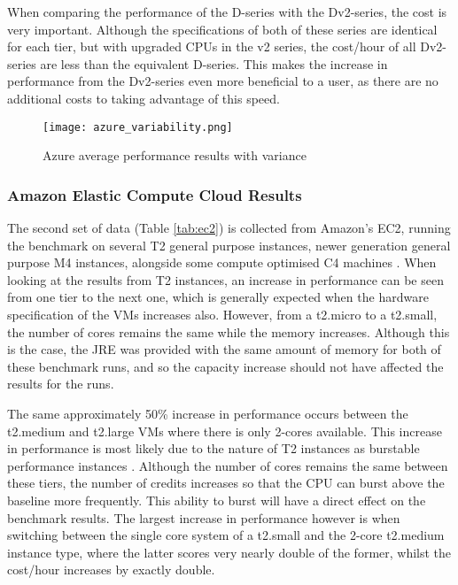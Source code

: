 \documentclass{llncs}
\begin{document}
When comparing the performance of the D-series with the Dv2-series, the cost is very important. Although the specifications of both of these series are identical for each tier, but with upgraded CPUs in the v2 series, the cost/hour of all Dv2-series are less than the equivalent D-series. This makes the increase in performance from the Dv2-series even more beneficial to a user, as there are no additional costs to taking advantage of this speed.



\begin{figure}[ht]
  \centering
  \texttt{[image: azure\_variability.png]}
  \caption{Azure average performance results with variance}
  \label{fig:azurevariability}
\end{figure}

\subsubsection{Amazon Elastic Compute Cloud Results}\label{sec:eval:awsresults}

The second set of data (Table \ref{tab:ec2}) is collected from Amazon's EC2, running the benchmark on several T2 general purpose instances, newer generation general purpose M4 instances, alongside some compute optimised C4 machines \cite{awsvmtype}. When looking at the results from T2 instances, an increase in performance can be seen from one tier to the next one, which is generally expected when the hardware specification of the VMs increases also. However, from a t2.micro to a t2.small, the number of cores remains the same while the memory increases. Although this is the case, the JRE was provided with the same amount of memory for both of these benchmark runs, and so the capacity increase should not have affected the results for the runs.

The same approximately 50\% increase in performance occurs between the t2.medium and t2.large VMs where there is only 2-cores available. This increase in performance is most likely due to the nature of T2 instances as burstable performance instances \cite{awsvmtype}. Although the number of cores remains the same between these tiers, the number of credits increases so that the CPU can burst above the baseline more frequently. This ability to burst will have a direct effect on the benchmark results. The largest increase in performance however is when switching between the single core system of a t2.small and the 2-core t2.medium instance type, where the latter scores very nearly double of the former, whilst the cost/hour increases by exactly double.
\end{document}
